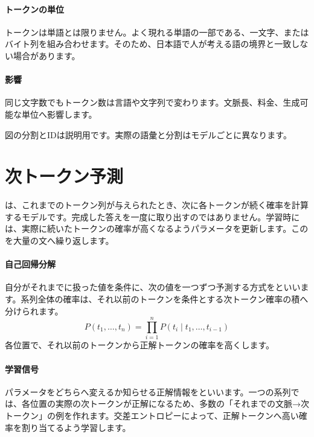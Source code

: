 \paragraph{トークンの単位}
        トークンは単語とは限りません。よく現れる単語の一部である、一文字、またはバイト列を組み合わせます。そのため、日本語で人が考える語の境界と一致しない場合があります。

\par
\endgroup
\medskip
\begingroup
\paragraph{影響}
        同じ文字数でもトークン数は言語や文字列で変わります。文脈長、料金、生成可能な単位へ影響します。

\par
\endgroup
  {\scriptsize 図の分割とIDは説明用です。実際の語彙と分割はモデルごとに異なります。}
\par
\endgroup


\section{次トークン予測}
\label{sec:06-machine-learning-28}

は、これまでのトークン列が与えられたとき、次に各トークンが続く確率を計算するモデルです。完成した答えを一度に取り出すのではありません。学習時には、実際に続いたトークンの確率が高くなるようパラメータを更新します。このを大量の文へ繰り返します。

\begingroup
\begingroup
\paragraph{自己回帰分解}
        自分がそれまでに扱った値を条件に、次の値を一つずつ予測する方式をといいます。系列全体の確率は、それ以前のトークンを条件とする次トークン確率の積へ分けられます。
        \[
          P(t_1,\ldots,t_n)
          =\prod_{i=1}^{n}
          P(t_i\mid t_1,\ldots,t_{i-1})
        \]
        各位置で、それ以前のトークンから正解トークンの確率を高くします。

\paragraph{学習信号}
        パラメータをどちらへ変えるか知らせる正解情報をといいます。一つの系列では、各位置の実際の次トークンが正解になるため、多数の「それまでの文脈→次トークン」の例を作れます。交差エントロピーによって、正解トークンへ高い確率を割り当てるよう学習します。

